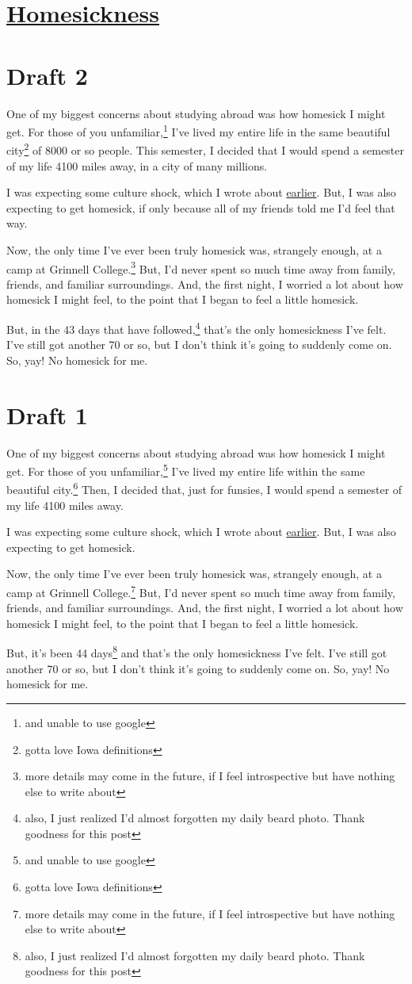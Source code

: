 \documentclass[12pt]{article}[titlepage]
\newcommand{\1}{\={a}}
\newcommand{\2}{\={e}}
\newcommand{\3}{\={\i}}
\newcommand{\4}{\=o}
\newcommand{\5}{\=u}
\newcommand{\6}{\={A}}
\renewcommand{\,}{\textsuperscript{,}}
\begin{document}
\doublespacing
\section{\href{homesickness.html}{Homesickness}}
\section{Draft 2}
One of my biggest concerns about studying abroad was how homesick I might get.
For those of you unfamiliar,\footnote{and unable to use google} I've lived my entire life in the same beautiful city\footnote{gotta love Iowa definitions} of 8000 or so people.
This semester, I decided that I would spend a semester of my life 4100 miles away, in a city of many millions.

I was expecting some culture shock, which I wrote about \href{small-changes.html}{earlier}.
But, I was also expecting to get homesick, if only because all of my friends told me I'd feel that way.

Now, the only time I've ever been truly homesick was, strangely enough, at a camp at Grinnell College.\footnote{more details may come in the future, if I feel introspective but have nothing else to write about}
But, I'd never spent so much time away from family, friends, and familiar surroundings.
And, the first night, I worried a lot about how homesick I might feel, to the point that I began to feel a little homesick.

But, in the 43 days that have followed,\footnote{also, I just realized I'd almost forgotten my daily beard photo. Thank goodness for this post} that's the only homesickness I've felt.
I've still got another 70 or so, but I don't think it's going to suddenly come on.
So, yay!
No homesick for me.
\section{Draft 1}
One of my biggest concerns about studying abroad was how homesick I might get.
For those of you unfamiliar,\footnote{and unable to use google} I've lived my entire life within the same beautiful city.\footnote{gotta love Iowa definitions}
Then, I decided that, just for funsies, I would spend a semester of my life 4100 miles away.

I was expecting some culture shock, which I wrote about \href{small-changes.html}{earlier}.
But, I was also expecting to get homesick.

Now, the only time I've ever been truly homesick was, strangely enough, at a camp at Grinnell College.\footnote{more details may come in the future, if I feel introspective but have nothing else to write about}
But, I'd never spent so much time away from family, friends, and familiar surroundings.
And, the first night, I worried a lot about how homesick I might feel, to the point that I began to feel a little homesick.

But, it's been 44 days\footnote{also, I just realized I'd almost forgotten my daily beard photo. Thank goodness for this post} and that's the only homesickness I've felt.
I've still got another 70 or so, but I don't think it's going to suddenly come on.
So, yay!
No homesick for me.
\end{document}

